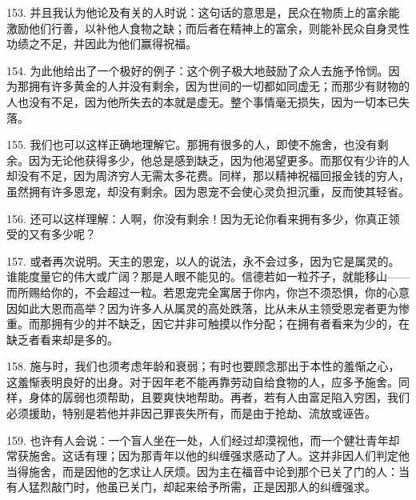 153. 并且我认为他论及有关的人时说：这句话的意思是，民众在物质上的富余能激励他们行善，以补他人食物之缺；而后者在精神上的富余，则能补民众自身灵性功绩之不足，并因此为他们赢得祝福。\par

154. 为此他给出了一个极好的例子：这个例子极大地鼓励了众人去施予怜悯。因为那拥有许多黄金的人并没有剩余，因为世间的一切都如同虚无；而那少有财物的人也没有不足，因为他所失去的本就是虚无。整个事情毫无损失，因为一切本已失落。\par

155. 我们也可以这样正确地理解它。那拥有很多的人，即使不施舍，也没有剩余。因为无论他获得多少，他总是感到缺乏，因为他渴望更多。而那仅有少许的人却没有不足，因为周济穷人无需太多花费。同样，那以精神祝福回报金钱的穷人，虽然拥有许多恩宠，却没有剩余。因为恩宠不会使心灵负担沉重，反而使其轻省。\par

156. 还可以这样理解：人啊，你没有剩余！因为无论你看来拥有多少，你真正领受的又有多少呢？\par

157. 或者再次说明。天主的恩宠，以人的说法，永不会过多，因为它是属灵的。谁能度量它的伟大或广阔？那是人眼不能见的。信德若如一粒芥子，就能移山——而所赐给你的，不会超过一粒。若恩宠完全寓居于你内，你岂不须恐惧，你的心意因如此大恩而高举？因为许多人从属灵的高处跌落，比从未从主领受恩宠者更为惨重。而那拥有少的并不缺乏，因它并非可触摸以作分配；在拥有者看来为少的，在缺乏者看来却是多的。\par

158. 施与时，我们也须考虑年龄和衰弱；有时也要顾念那出于本性的羞惭之心，这羞惭表明良好的出身。对于因年老不能再靠劳动自给食物的人，应多予施舍。同样，身体的孱弱也须帮助，且要爽快地帮助。再者，若有人由富足陷入穷困，我们必须援助，特别是若他并非因己罪丧失所有，而是由于抢劫、流放或诬告。\par

159. 也许有人会说：一个盲人坐在一处，人们经过却漠视他，而一个健壮青年却常获施舍。这话有理；因为那青年以他的纠缠强求感动了人。这并非因人们判定他当得施舍，而是因他的乞求让人厌烦。因为主在福音中论到那个已关了门的人：当有人猛烈敲门时，他虽已关门，却起来给予所需，正是因那人的纠缠强求。\par


